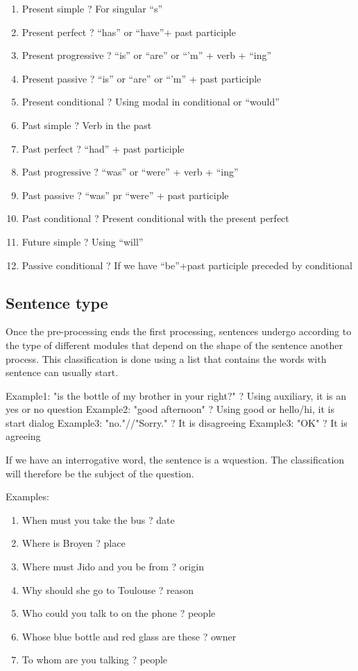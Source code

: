 \documentclass[twoside,a4paper,10pt]{report}
\begin{document}
\begin{enumerate}    \item  Present simple ? For singular “s”
    \item  Present perfect ? “has” or “have”+ past participle
    \item  Present progressive ? “is” or “are” or “’m” + verb + “ing”
    \item  Present passive ? “is” or “are” or “’m” + past participle
    \item  Present conditional ? Using modal in conditional or “would”
    \item  Past simple ? Verb in the past
    \item  Past perfect ? “had” + past participle
    \item  Past progressive ? “was” or “were” + verb + “ing”
    \item  Past passive ? “was” pr “were” + past participle
    \item  Past conditional ? Present conditional with the present perfect
    \item  Future simple ? Using “will”
    \item  Passive conditional ? If we have “be”+past participle preceded by conditional
\end{enumerate}

\subsection{Sentence type}
\label{1cae782fdfad8b38f1b3641092175803}%
Once the pre-processing ends the first processing, sentences undergo according to the type of different modules that depend on the shape of the sentence another process. This classification is done using a list that contains the words with sentence can usually start.


\small
\begin{verbatimtab}
  Example1: "is the bottle of my brother in your right?"
  ? Using auxiliary, it is an yes or no question
  Example2: "good afternoon"
  ? Using good or hello/hi, it is start dialog 
  Example3: "no."//"Sorry."
  ? It is disagreeing
  Example3: "OK"
  ? It is agreeing
\end{verbatimtab}
\normalsize
If we have an interrogative word, the sentence is a w{\textunderscore}question. The classification will therefore be the subject of the question. 

Examples:


\begin{enumerate}    \item  When must you take the bus ? date
    \item  Where is Broyen ? place
    \item  Where must Jido and you be from ? origin
    \item  Why should she go to Toulouse ? reason
    \item  Who could you talk to on the phone ? people
    \item  Whose blue bottle and red glass are these ? owner
    \item  To whom are you talking ? people
\end{enumerate}
\end{document}

